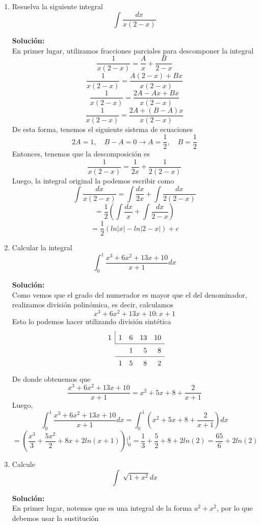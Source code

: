 \documentclass[12pt]{article}
\newenvironment{solucion}
{\begin{mdframed}[backgroundcolor=black!10]
		{\bf Solución:}\\
	}
	{
	\end{mdframed}
}
\newenvironment{preguntas}
{\begin{enumerate}\itemsep12pt
	}
	{
	\end{enumerate}
}
\newcommand{\ev}{\Big|}
\newcommand{\ra}{\rightarrow}
\begin{document}
\begin{preguntas}
\begin{solucion}
\begin{enumerate}[a)]
\end{enumerate}
\end{solucion}
\item Resuelva la siguiente integral
	$$\displaystyle\int \dfrac{dx}{x(2-x)}$$
\begin{solucion}
En primer lugar, utilizamos fracciones parciales para descomponer la integral
		$$\dfrac{1}{x(2-x)} = \dfrac{A}{x} + \dfrac{B}{2-x}$$
		$$\dfrac{1}{x(2-x)} = \dfrac{A(2-x) + Bx}{x(2-x)}$$
		$$\dfrac{1}{x(2-x)} = \dfrac{2A-Ax + Bx}{x(2-x)}$$
		$$\dfrac{1}{x(2-x)} = \dfrac{2A+ (B-A)x}{x(2-x)}$$
		De esta forma, tenemos el siguiente sistema de ecuaciones
		$$2A = 1, \quad B-A = 0 \ra A = \dfrac{1}{2}, \quad B = \dfrac{1}{2}$$
		Entonces, tenemos que la descomposición es
		$$\dfrac{1}{x(2-x)} = \dfrac{1}{2x} + \dfrac{1}{2(2-x)}$$
		Luego, la integral original la podemos escribir como
		$$\displaystyle\int \dfrac{dx}{x(2-x)} = \displaystyle\int \dfrac{dx}{2x} + \displaystyle\int \dfrac{dx}{2(2-x)}$$
		$$ = \dfrac{1}{2} \left( \displaystyle\int \dfrac{dx}{x} + \displaystyle\int \dfrac{dx}{2-x} \right)$$
		$$ = \dfrac{1}{2} (ln|x| - ln|2-x| ) + c$$
\end{solucion}
\item Calcular la integral
	$$\displaystyle\int_0^1 \dfrac{x^3+6x^2+13x+10}{x+1}dx$$
\begin{solucion}
Como vemos que el grado del numerador es mayor que el del denominador, realizamos división polinómica, es decir, calculamos
		$$x^3+6x^2+13x+10 : x+1$$
		Esto lo podemos hacer utilizando división sintética
		$$
		\renewcommand\arraystretch{1.5}
		\setlength\doublerulesep{0pt}
		\begin{array}{rrrrr}
		\multicolumn{1}{r|}{1} & 1 & 6 & 13 & 10\\\cline{2-5}
		& & 1& 5 & 8 \\\cline{2-5}
		& 1 & 5& 8 & 2 
		\end{array}
		$$
		De donde obtenemos que
		$$\dfrac{x^3+6x^2+13x+10}{x+1} = x^2 +5x + 8 + \dfrac{2}{x+1}$$
		Luego,
		$$\displaystyle\int_0^1 \dfrac{x^3+6x^2+13x+10}{x+1}dx = \displaystyle\int_0^1 \left(x^2 + 5x + 8 +  \dfrac{2}{x+1}\right)dx$$
		$$= \left( \dfrac{x^3}{3} + \dfrac{5x^2}{2} + 8x + 2ln(x+1)\right) \ev_0^1 = \dfrac{1}{3} + \dfrac{5}{2} + 8 + 2ln(2) = \dfrac{65}{6} + 2 ln(2)$$
\end{solucion}
\item Calcule
$$\displaystyle\int \sqrt[]{1+x^2}dx$$
\begin{solucion}
En primer lugar, notemos que es una integral de la forma $a^2 + x^2$, por lo que debemos usar la sustitución

\end{solucion}
\end{preguntas}
\end{document}
